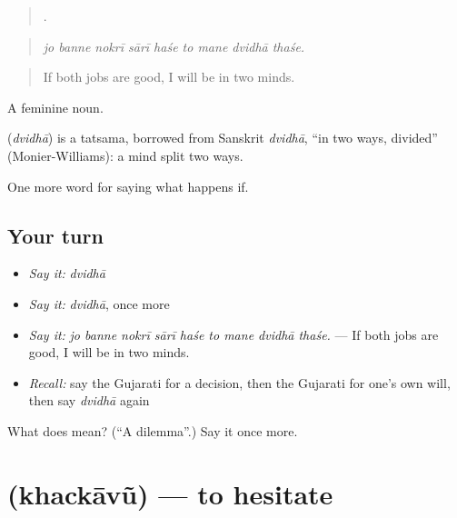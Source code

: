 \begin{quote}
        .
\end{quote}

\begin{quote}
\emph{jo banne nokrī sārī haśe to mane dvidhā thaśe.}
\end{quote}

\begin{quote}
If both jobs are good, I will be in two minds.
\end{quote}

A feminine noun.

\begin{cousinweb}
\textbf{} (\emph{dvidhā}) is a tatsama, borrowed from Sanskrit \emph{dvidhā}, \textquotedblleft{}in two ways, divided\textquotedblright{} (Monier-Williams): a mind split two ways.
\end{cousinweb}

\begin{grammarlens}[title={What you've built}]
One more word for saying what happens if.
\end{grammarlens}

\subsection*{Your turn}
\begin{itemize}
\raggedright
  \item \emph{Say it:} \emph{dvidhā}
  \item \emph{Say it:} \emph{dvidhā}, once more
  \item \emph{Say it:} \emph{jo banne nokrī sārī haśe to mane dvidhā thaśe.} — If both jobs are good, I will be in two minds.
  \item \emph{Recall:} say the Gujarati for a decision, then the Gujarati for one's own will, then say \emph{dvidhā} again
\end{itemize}

\begin{tcolorbox}[breakable,colback=teal!4,colframe=teal!35!black,title={Before you move on}]
What does  mean? (\textquotedblleft{}A dilemma\textquotedblright{}.) Say it once more.
\end{tcolorbox}
\section[\texorpdfstring{\gu{ખચકાવું} (khackāvũ)}{ખચકાવું (khackāvũ)}]{ (khackāvũ) — to hesitate}

